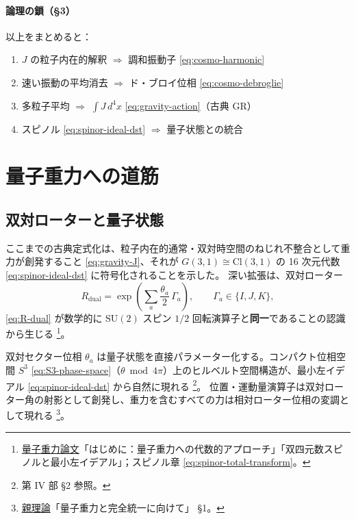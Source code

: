 \documentclass[dvipdfmx,a4paper,oneside]{jsbook}
\numberwithin{equation}{chapter}
\begin{document}
\paragraph{論理の鎖（§3）}
以上をまとめると：
\begin{enumerate}[leftmargin=2em]
  \item \(J\) の粒子内在的解釈 \(\Rightarrow\) 調和振動子 \eqref{eq:cosmo-harmonic}
  \item 速い振動の平均消去 \(\Rightarrow\) ド・ブロイ位相 \eqref{eq:cosmo-debroglie}
  \item 多粒子平均 \(\Rightarrow\) \(\int J\, d^4x\) \eqref{eq:gravity-action}（古典 GR）
  \item スピノル \eqref{eq:spinor-ideal-dst} \(\Rightarrow\) 量子状態との統合
\end{enumerate}

\section{量子重力への道筋}

\subsection{双対ローターと量子状態}

ここまでの古典定式化は、粒子内在的通常・双対時空間のねじれ不整合として重力が創発すること \eqref{eq:gravity-J}、それが \(G(3,1) \cong \mathrm{Cl}(3,1)\) の 16 次元代数 \eqref{eq:spinor-ideal-dst} に符号化されることを示した。
深い拡張は、双対ローター
\begin{equation}
  R_{\mathrm{dual}}
  = \exp\!\left(\sum_a \frac{\theta_a}{2}\,\Gamma_a\right),
  \qquad \Gamma_a \in \{I, J, K\},
  \label{eq:qg-R-dual}
\end{equation}
\eqref{eq:R-dual} が数学的に \(\mathrm{SU}(2)\) スピン \(1/2\) 回転演算子と\textbf{同一}であることの認識から生じる \footnote{\hyperref[sec:sister-manuscripts]{量子重力論文}「はじめに：量子重力への代数的アプローチ」「双四元数スピノルと最小左イデアル」；スピノル章 \eqref{eq:spinor-total-transform}。}。

双対セクター位相 \(\theta_a\) は量子状態を直接パラメーター化する。コンパクト位相空間 \(S^3\) \eqref{eq:S3-phase-space}（\(\theta \bmod 4\pi\)）上のヒルベルト空間構造が、最小左イデアル \eqref{eq:spinor-ideal-dst} から自然に現れる \footnote{第 IV 部 §2 参照。}。
位置・運動量演算子は双対ローター角の射影として創発し、重力を含むすべての力は相対ローター位相の変調として現れる \footnote{\hyperref[sec:sister-manuscripts]{親理論}「量子重力と完全統一に向けて」 §1。}。
\end{document}

